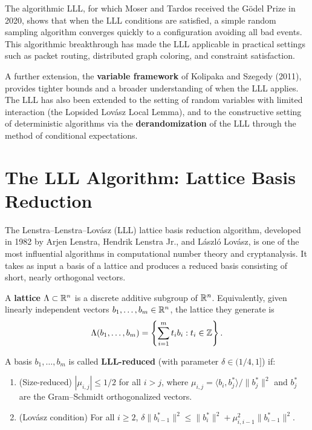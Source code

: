 The algorithmic LLL, for which Moser and Tardos received the G\"{o}del Prize in 2020, shows that when the LLL conditions are satisfied, a simple random sampling algorithm converges quickly to a configuration avoiding all bad events. This algorithmic breakthrough has made the LLL applicable in practical settings such as packet routing, distributed graph coloring, and constraint satisfaction.

A further extension, the \textbf{variable framework} of Kolipaka and Szegedy (2011), provides tighter bounds and a broader understanding of when the LLL applies. The LLL has also been extended to the setting of random variables with limited interaction (the Lopsided Lov\'{a}sz Local Lemma), and to the constructive setting of deterministic algorithms via the \textbf{derandomization} of the LLL through the method of conditional expectations.

\section{The LLL Algorithm: Lattice Basis Reduction}

The Lenstra--Lenstra--Lov\'{a}sz (LLL) lattice basis reduction algorithm, developed in 1982 by Arjen Lenstra, Hendrik Lenstra Jr., and L\'{a}szl\'{o} Lov\'{a}sz, is one of the most influential algorithms in computational number theory and cryptanalysis. It takes as input a basis of a lattice and produces a reduced basis consisting of short, nearly orthogonal vectors.

\begin{definition}[Lattice]
A \textbf{lattice} \(\Lambda \subset \mathbb{R}^n\) is a discrete additive subgroup of \(\mathbb{R}^n\). Equivalently, given linearly independent vectors \(b_1, \dots, b_m \in \mathbb{R}^n\), the lattice they generate is
\[
\Lambda(b_1, \dots, b_m) = \left\{ \sum_{i=1}^m t_i b_i : t_i \in \mathbb{Z} \right\}.
\]
\end{definition}

A basis \(b_1, \dots, b_m\) is called \textbf{LLL-reduced} (with parameter \(\delta \in (1/4, 1]\)) if:
\begin{enumerate}
  \item (Size-reduced) \(|\mu_{i,j}| \leq 1/2\) for all \(i > j\), where \(\mu_{i,j} = \langle b_i, b_j^* \rangle / \|b_j^*\|^2\) and \(b_j^*\) are the Gram--Schmidt orthogonalized vectors.
  \item (Lov\'{a}sz condition) For all \(i \geq 2\), \(\delta \|b_{i-1}^*\|^2 \leq \|b_i^*\|^2 + \mu_{i,i-1}^2 \|b_{i-1}^*\|^2\).
\end{enumerate}

